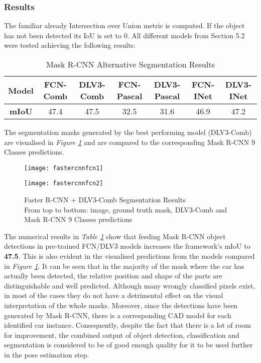 \documentclass[main.tex]{subfiles}
\begin{document}
\subsubsection{Results}
The familiar already Intersection over Union metric is computed. If the object has not been detected its IoU is set to 0. All different models from Section 5.2 were tested achieving the following results:
\begin{table}[H]
	\centering
	\begin{tabular}{| c || c | c | c | c | c | c |}
		\hline 
  		\textbf{Model} & FCN-Comb & DLV3-Comb & FCN-Pascal & DLV3-Pascal & FCN-INet & DLV3-INet \\
  		\hline
   		\textbf{mIoU} & 47.4 & 47.5 & 32.5 & 31.6 & 46.9 & 47.2 \\
		\hline
	\end{tabular}	
\caption{Mask R-CNN Alternative Segmentation Results}
\label{tab:results_fasterfcn}
\end{table}
\indent The segmentation masks generated by the best performing model (DLV3-Comb) are visualised in \emph{Figure \ref{fig:fasterfcn}} and are compared to the corresponding Mask R-CNN 9 Classes predictions.
\begin{figure}[H]
\centering
\texttt{[image: fastercnnfcn1]}
\end{figure}
\begin{figure}[h]
\centering
\texttt{[image: fastercnnfcn2]}
\captionsetup{justification=centering}
\caption{Faster R-CNN + DLV3-Comb Segmentation Results \\ From top to bottom: image, ground truth mask, DLV3-Comb and Mask R-CNN 9 Classes predictions}
\label{fig:fasterfcn}
\end{figure}
\indent The numerical results in \emph{Table \ref{tab:results_fasterfcn}} show that feeding Mask R-CNN object detections in pre-trained FCN/DLV3 models increases the framework's mIoU to \textbf{47.5}. This is also evident in the visualised predictions from the models compared in \emph{Figure \ref{fig:fasterfcn}}. It can be seen that in the majority of the mask where the car has actually been detected, the relative position and shape of the parts are distinguishable and well predicted. Although many wrongly classified pixels exist, in most of the cases they do not have a detrimental effect on the visual interpretation of the whole masks. Moreover, since the detections have been generated by Mask R-CNN, there is a corresponding CAD model for each identified car instance. Consequently, despite the fact that there is a lot of room for improvement, the combined output of object detection, classification and segmentation is considered to be of good enough quality for it to be used further in the pose estimation step.
\end{document}
